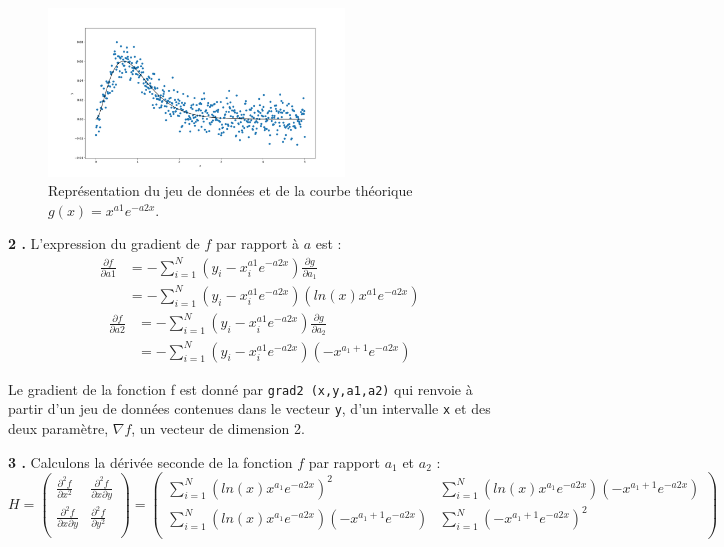 \documentclass[12pt]{article}
\begin{document}
 
  \begin{figure}[H]
\centering
\includegraphics[width=0.7\textwidth]{Q12.png}
\caption{Représentation du jeu de données et de la courbe théorique $g(x)= x^{a1}e^{-a2x}$.}
\label{FigQ12}
\end{figure}

 \textbf{\color{brick}2 .} L'expression du gradient de $f$ par rapport à $a$ est :
 \begin{align*}
     \frac{\partial f}{\partial a1} &= -\sum_{i=1}^N (y_i - x_i^{a1}e^{-a2x})\frac{\partial g}{\partial a_1} \\
     &= -\sum_{i=1}^N (y_i - x_i^{a1}e^{-a2x})(ln(x)x^{a1}e^{-a2x})
 \end{align*}{}
  \begin{align*}
     \frac{\partial f}{\partial a2} &= -\sum_{i=1}^N (y_i - x_i^{a1}e^{-a2x})\frac{\partial g}{\partial a_2} \\
     &= -\sum_{i=1}^N (y_i - x_i^{a1}e^{-a2x})(-x^{a_1+1}e^{-a2x})
 \end{align*}{}
 
 Le gradient de la fonction f est donné par \verb|grad2 (x,y,a1,a2)| qui renvoie à partir d'un jeu de données contenues dans le vecteur \verb|y|, d'un intervalle \verb|x| et des deux paramètre, $\nabla f$, un vecteur de dimension 2.
 
 
  \textbf{\color{brick}3 .} Calculons la dérivée seconde de la fonction $f$ par rapport $a_1$ et $a_2$ :
  $$H = \begin{pmatrix} 
\frac{\partial^2 f}{\partial x^2} & \frac{\partial^2 f}{\partial x\partial y} \\
\frac{\partial^2 f}{\partial x \partial y} & \frac{\partial^2 f}{\partial y^2} \\
\end{pmatrix} =
\begin{pmatrix} 
\sum_{i=1}^N (ln(x) x^{a_1} e^{-a2x})^2 & \sum_{i=1}^N (ln(x) x^{a_1} e^{-a2x})(-x^{a_1+1}e^{-a2x})  \\
 \sum_{i=1}^N (ln(x) x^{a_1} e^{-a2x})(-x^{a_1+1}e^{-a2x}) & \sum_{i=1}^N (-x^{a_1+1}e^{-a2x})^2 \\
\end{pmatrix}
$$
\end{document}

